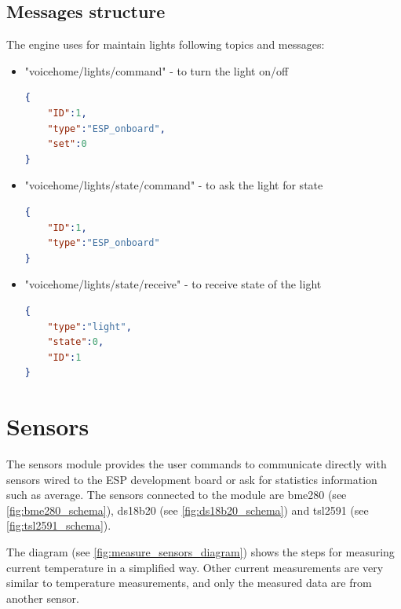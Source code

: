 \subsection{Messages structure}
The engine uses for maintain lights following topics and messages:

\begin{itemize}
    \item "voicehome/lights/command" - to turn the light on/off
    \begin{lstlisting}[language=json,firstnumber=1,caption={Structure of JSON message to turn on/off the light in module \textit{Lights}},captionpos=b,xleftmargin=1cm]
{
    "ID":1,
    "type":"ESP_onboard",
    "set":0
}
    \end{lstlisting}
    \item "voicehome/lights/state/command" - to ask the light for state
    \begin{lstlisting}[language=json,firstnumber=1,caption={Structure of JSON message to asking for the state of the light in module \textit{Lights}},captionpos=b,xleftmargin=1cm]
{
    "ID":1,
    "type":"ESP_onboard"
}
    \end{lstlisting}
    \item "voicehome/lights/state/receive" - to receive state of the light
    \begin{lstlisting}[language=json,firstnumber=1,caption={Structure of JSON message to receive state of the light in module \textit{Lights}},captionpos=b,xleftmargin=1cm]
{
    "type":"light",
    "state":0,
    "ID":1
}
    \end{lstlisting}
\end{itemize}

\section{Sensors}

The sensors module provides the user commands to communicate directly with sensors wired to the ESP development board or ask for statistics information such as average. The sensors connected to the module are bme280 (see \cref{fig:bme280_schema}), ds18b20 (see \cref{fig:ds18b20_schema}) and tsl2591 (see \cref{fig:tsl2591_schema}). 

The diagram (see \cref{fig:measure_sensors_diagram}) shows the steps for measuring current temperature in a simplified way. Other current measurements are very similar to temperature measurements, and only the measured data are from another sensor.

